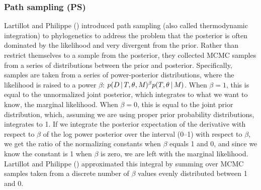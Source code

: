 \subsubsection{Path sampling (PS)}
Lartillot and Philippe (\citeyear{Lartillot2006}) introduced path sampling
(also called thermodynamic integration) to phylogenetics to address the problem
that the posterior is often dominated by the likelihood and very divergent from
the prior.
Rather than restrict themselves to a sample from the posterior, they collected
MCMC samples from a series of distributions between the prior and posterior.
Specifically, samples are taken from a series of power-posterior distributions,
where the likelihood is raised to a power $\beta$:
$ p(D \,|\, T, \theta_{}, M_{})^{\beta}
p(T, \theta_{} \,|\, M_{})$.
When $\beta = 1$, this is equal to the unnormalized joint posterior, which
integrates to what we want to know, the marginal likelihood.
When $\beta = 0$, this is equal to the joint prior distribution, which,
assuming we are using proper prior probability distributions, integrates to 1.
If we integrate the posterior expectation of the derivative with respect to $\beta$ of the log power posterior
over the interval (0--1) with respect to $\beta$,
we get the ratio of the normalizing constants when $\beta$ equals 1 and 0, and
since we know the constant is 1 when $\beta$ is zero, we are left with the
marginal likelihood.
Lartillot and Philippe (\citeyear{Lartillot2006}) approximated this integral by
summing over MCMC samples taken from a discrete number of $\beta$ values evenly
distributed between 1 and 0.

